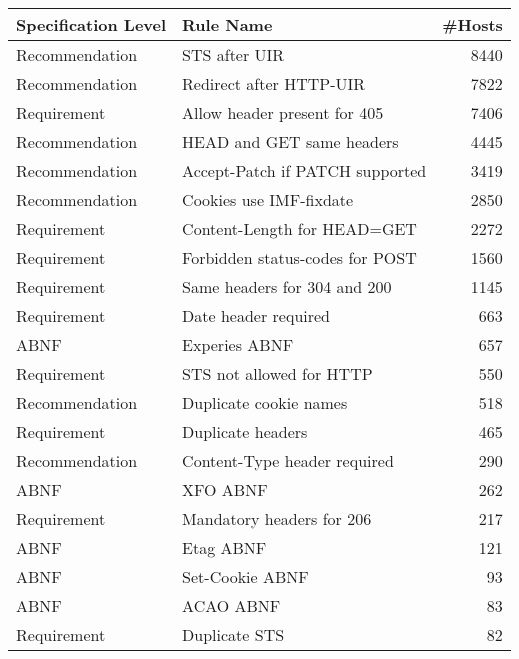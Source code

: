 \begin{tabular}{llr}
\toprule
Specification Level &                                   Rule Name &  \#Hosts \\
\midrule
     Recommendation &                       STS after UIR\rlap{*} &     8440 \\
     Recommendation &                     Redirect after HTTP-UIR &     7822 \\
        Requirement &                Allow header present for 405 &     7406 \\
     Recommendation &                   HEAD and GET same headers &     4445 \\
     Recommendation &             Accept-Patch if PATCH supported &     3419 \\
     Recommendation &                     Cookies use IMF-fixdate &     2850 \\
        Requirement &                 Content-Length for HEAD=GET &     2272 \\
        Requirement &             Forbidden status-codes for POST &     1560 \\
        Requirement &                Same headers for 304 and 200 &     1145 \\
        Requirement &                        Date header required &      663 \\
               ABNF &                               Experies ABNF &      657 \\
        Requirement &                    STS not allowed for HTTP &      550 \\
     Recommendation &                      Duplicate cookie names &      518 \\
        Requirement &                           Duplicate headers &      465 \\
     Recommendation &                Content-Type header required &      290 \\
               ABNF &                                    XFO ABNF &      262 \\
        Requirement &                   Mandatory headers for 206 &      217 \\
               ABNF &                                   Etag ABNF &      121 \\
               ABNF &                             Set-Cookie ABNF &       93 \\
               ABNF &                                   ACAO ABNF &       83 \\
        Requirement &                               Duplicate STS &       82 \\

\end{tabular}
